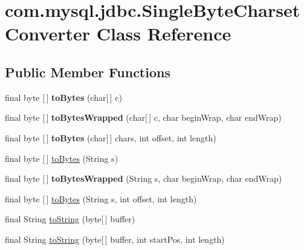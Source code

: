 \hypertarget{classcom_1_1mysql_1_1jdbc_1_1_single_byte_charset_converter}{}\section{com.\+mysql.\+jdbc.\+Single\+Byte\+Charset\+Converter Class Reference}
\label{classcom_1_1mysql_1_1jdbc_1_1_single_byte_charset_converter}
\subsection*{Public Member Functions}
\begin{DoxyCompactItemize}
\item 
\mbox{\label{classcom_1_1mysql_1_1jdbc_1_1_single_byte_charset_converter_aed8174d9a617a107e837d27943c98662}} 
final byte \mbox{[}$\,$\mbox{]} {\bfseries to\+Bytes} (char\mbox{[}$\,$\mbox{]} c)
\item 
\mbox{\label{classcom_1_1mysql_1_1jdbc_1_1_single_byte_charset_converter_a3605f2b813c48d524e36ea94469761ed}} 
final byte \mbox{[}$\,$\mbox{]} {\bfseries to\+Bytes\+Wrapped} (char\mbox{[}$\,$\mbox{]} c, char begin\+Wrap, char end\+Wrap)
\item 
\mbox{\label{classcom_1_1mysql_1_1jdbc_1_1_single_byte_charset_converter_a9dd65ab0c0b2d5a5c8a3519ddfbfd71f}} 
final byte \mbox{[}$\,$\mbox{]} {\bfseries to\+Bytes} (char\mbox{[}$\,$\mbox{]} chars, int offset, int length)
\item 
final byte \mbox{[}$\,$\mbox{]} \mbox{\hyperlink{classcom_1_1mysql_1_1jdbc_1_1_single_byte_charset_converter_a88dcfd9fecdfa02f7f61be8f24f5d973}{to\+Bytes}} (String s)
\item 
\mbox{\label{classcom_1_1mysql_1_1jdbc_1_1_single_byte_charset_converter_ab173235f77834fe19616c7c43b7de9fb}} 
final byte \mbox{[}$\,$\mbox{]} {\bfseries to\+Bytes\+Wrapped} (String s, char begin\+Wrap, char end\+Wrap)
\item 
final byte \mbox{[}$\,$\mbox{]} \mbox{\hyperlink{classcom_1_1mysql_1_1jdbc_1_1_single_byte_charset_converter_ac88a7b12c138cada583fed31cd800bb7}{to\+Bytes}} (String s, int offset, int length)
\item 
final String \mbox{\hyperlink{classcom_1_1mysql_1_1jdbc_1_1_single_byte_charset_converter_a4ff777805c18fb811faf1310a02f9814}{to\+String}} (byte\mbox{[}$\,$\mbox{]} buffer)
\item 
final String \mbox{\hyperlink{classcom_1_1mysql_1_1jdbc_1_1_single_byte_charset_converter_ac1f5f932c49579ae691341e20ffac33b}{to\+String}} (byte\mbox{[}$\,$\mbox{]} buffer, int start\+Pos, int length)
\end{DoxyCompactItemize}
